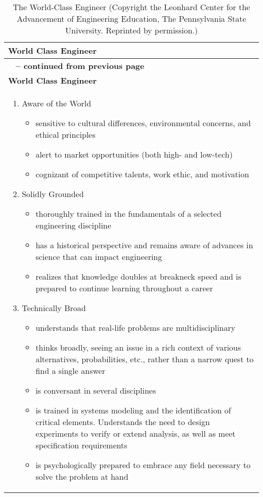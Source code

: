 \footnotesize
\begin{longtable}[c]{|m{14cm}|}
\caption{The World-Class Engineer (Copyright the Leonhard
Center for the Advancement of Engineering Education, The Pennsylvania
State University. Reprinted by permission.) 
\label{table:worldClassEngineer}}\\


\hline
\rowcolor{Gray}
\textbf{World Class Engineer} \\ \hline
\endfirsthead

\hline
\rowcolor{Gray}
{{\bfseries \tablename\ \thetable{} -- continued from previous page}} \\ \hline
\rowcolor{Gray}
\textbf{World Class Engineer} \\ \hline
\endhead
\endfoot

\hline

\begin{enumerate}
\itemsep0em 
\def\labelenumi{\Roman{enumi})}

\item Aware of the World 
\begin{itemize}
\itemsep0em 
\item  sensitive to cultural differences, environmental concerns, and ethical  principles
\item  alert to market opportunities (both high- and low-tech)
\item  cognizant of competitive talents, work ethic, and motivation
\end{itemize}

\item Solidly Grounded
\begin{itemize}
\itemsep0em 
\item  thoroughly trained in the fundamentals of a selected engineering
  discipline
\item  has a historical perspective and remains aware of advances in science
  that can impact engineering
\item  realizes that knowledge doubles at breakneck speed and is prepared to
  continue learning throughout a career
\end{itemize}

\item Technically Broad
\begin{itemize}
\itemsep0em 
\item  understands that real-life problems are multidisciplinary
\item  thinks broadly, seeing an issue in a rich context of various
  alternatives, probabilities, etc., rather than a narrow quest to find
  a single answer
\item  is conversant in several disciplines
\item  is trained in systems modeling and the identification of critical
  elements. Understands the need to design experiments to verify or
  extend analysis, as well as meet specification requirements
\item  is psychologically prepared to embrace any field necessary to solve
  the problem at hand
\end{itemize}


\end{enumerate}
\end{longtable}

